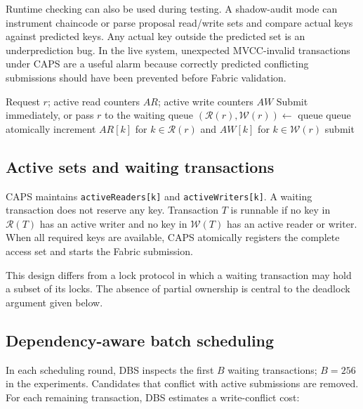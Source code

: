 \documentclass[fleqn,10pt,lineno]{wlpeerj}
\newcommand{\Rset}{\mathcal{R}}
\newcommand{\Wset}{\mathcal{W}}
\begin{document}
Runtime checking can also be used during testing. A shadow-audit mode can instrument chaincode or parse proposal read/write sets and compare actual keys against predicted keys. Any actual key outside the predicted set is an underprediction bug. In the live system, unexpected MVCC-invalid transactions under CAPS are a useful alarm because correctly predicted conflicting submissions should have been prevented before Fabric validation.

\begin{algorithm}[ht]
\caption{ACG: access-set conflict guard}
\label{alg:acg}
\begin{algorithmic}[1]
\Require Request $r$; active read counters $AR$; active write counters $AW$
\Ensure Submit immediately, or pass $r$ to the waiting queue
\State $(\Rset(r),\Wset(r)) \gets$ 
\ForAll{$k\in\Rset(r)$}
    \State \Return queue
  \EndIf
\EndFor
\ForAll{$k\in\Wset(r)$}
    \State \Return queue
  \EndIf
\EndFor
\State atomically increment $AR[k]$ for $k\in\Rset(r)$ and $AW[k]$ for $k\in\Wset(r)$
\State \Return submit
\end{algorithmic}
\end{algorithm}

\subsection*{Active sets and waiting transactions}

CAPS maintains \texttt{activeReaders[k]} and \texttt{activeWriters[k]}. A waiting transaction does not reserve any key. Transaction $T$ is runnable if no key in $\Rset(T)$ has an active writer and no key in $\Wset(T)$ has an active reader or writer. When all required keys are available, CAPS atomically registers the complete access set and starts the Fabric submission.

This design differs from a lock protocol in which a waiting transaction may hold a subset of its locks. The absence of partial ownership is central to the deadlock argument given below.

\subsection*{Dependency-aware batch scheduling}

In each scheduling round, DBS inspects the first $B$ waiting transactions; $B=256$ in the experiments. Candidates that conflict with active submissions are removed. For each remaining transaction, DBS estimates a write-conflict cost:
\end{document}
